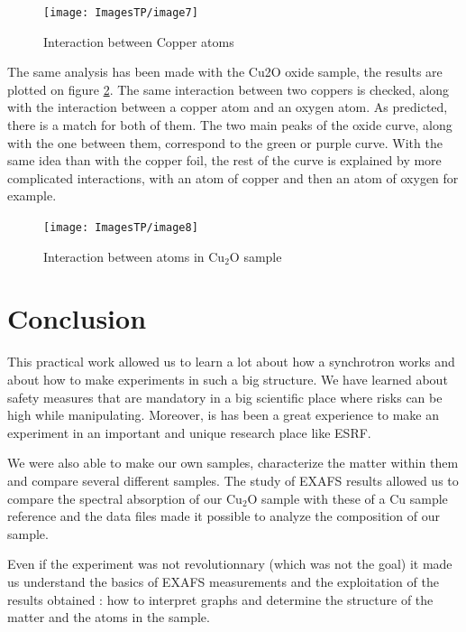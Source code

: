 \documentclass[11pt,a4paper,oneside]{report}
\begin{document}
\begin{figure}[H]
    \begin{center}
        \texttt{[image: ImagesTP/image7]}
        \caption{Interaction between Copper atoms}
        \label{graph4}
    \end{center}
\end{figure}

The same analysis has been made with the Cu2O oxide sample, the results are plotted on figure \ref{graph5}. The same interaction between two coppers is checked, along with the interaction between a copper atom and an oxygen atom. As predicted, there is a match for both of them. The two main peaks of the oxide curve, along with the one between them, correspond to the green or purple curve. With the same idea than with the copper foil, the rest of the curve is explained by more complicated interactions, with an atom of copper and then an atom of oxygen for example.
\begin{figure}[H]
    \begin{center}
        \texttt{[image: ImagesTP/image8]}
        \caption{Interaction between atoms in Cu$_2$O sample}
        \label{graph5}
    \end{center}
\end{figure}

\clearpage
\newpage

\chapter*{Conclusion}

	This practical work allowed us to learn a lot about how a synchrotron works and about how to make experiments in such a big structure. We have learned about safety measures that are mandatory in a big scientific place where risks can be high while manipulating. Moreover, is has been a great experience to make an experiment in an important and unique research place like ESRF.
		
	We were also able to make our own samples, characterize the matter within them and compare several different samples. The study of EXAFS results allowed us to compare the spectral absorption of our Cu$_2$O sample with these of a Cu sample reference and the data files made it possible to analyze the composition of our sample. 
	
	Even if the experiment was not revolutionnary (which was not the goal) it made us understand the basics of EXAFS measurements and the exploitation of the results obtained : how to interpret graphs and determine the structure of the matter and the atoms in the sample.

\nocite{*}


\end{document}

